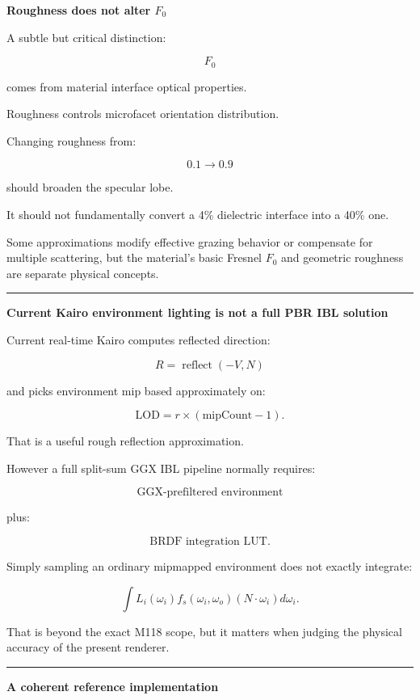 \textbf{Roughness does not alter \(F_0\)}

A subtle but critical distinction:

\[
F_0
\]

comes from material interface optical properties.

Roughness controls microfacet orientation distribution.

Changing roughness from:

\[
0.1\rightarrow0.9
\]

should broaden the specular lobe.

It should not fundamentally convert a 4\% dielectric interface into a 40\% one.

Some approximations modify effective grazing behavior or compensate for multiple scattering, but the material's basic Fresnel \(F_0\) and geometric roughness are separate physical concepts.

\begin{center}\rule{0.5\linewidth}{0.5pt}\end{center}

\textbf{Current Kairo environment lighting is not a full PBR IBL solution}

Current real-time Kairo computes reflected direction:

\[
R=\operatorname{reflect}(-V,N)
\]

and picks environment mip based approximately on:

\[
\text{LOD}
=
r\times(\text{mipCount}-1).
\]

That is a useful rough reflection approximation.

However a full split-sum GGX IBL pipeline normally requires:

\[
\text{GGX-prefiltered environment}
\]

plus:

\[
\text{BRDF integration LUT}.
\]

Simply sampling an ordinary mipmapped environment does not exactly integrate:

\[
\int
L_i(\omega_i)
f_s(\omega_i,\omega_o)
(N\cdot\omega_i)
d\omega_i.
\]

That is beyond the exact M118 scope, but it matters when judging the physical accuracy of the present renderer.

\begin{center}\rule{0.5\linewidth}{0.5pt}\end{center}

\textbf{A coherent reference implementation}


